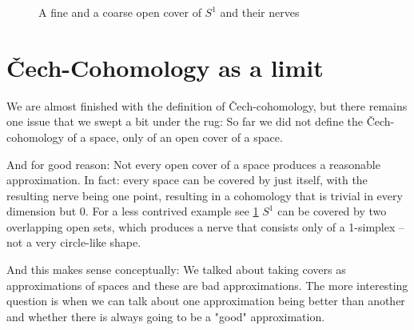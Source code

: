 \begin{figure}
	\centering
	\begin{tcolorbox}[segmentation style={solid}]
	    \begin{tcbraster}[raster columns=2]
		\end{tcbraster}
		\tcblower
		\begin{tcbraster}[raster columns=2]
	    \end{tcbraster}
	\end{tcolorbox}
	\label{figure:circle_nerves}
	\caption{A fine and a coarse open cover of $S^1$ and their nerves}
\end{figure}

\section{Čech-Cohomology as a limit}
We are almost finished with the definition of Čech-cohomology, but there remains one issue that we
swept a bit under the rug: So far we did not define the Čech-cohomology of a space, only of an open
cover of a space.

And for good reason: Not every open cover of a space produces a reasonable approximation. In fact: every
space can be covered by just itself, with the resulting nerve being one point, resulting in a cohomology
that is trivial in every dimension but 0. For a less contrived example see \ref{figure:circle_nerves} 
$S^1$ can be covered by two overlapping open sets, which produces a nerve that consists only of a 1-simplex –
not a very circle-like shape.

And this makes sense conceptually: We talked about taking covers as approximations of spaces
and these are bad approximations. The more interesting question is when we can talk about one approximation being better
than another and whether there is always going to be a "good" approximation. 

